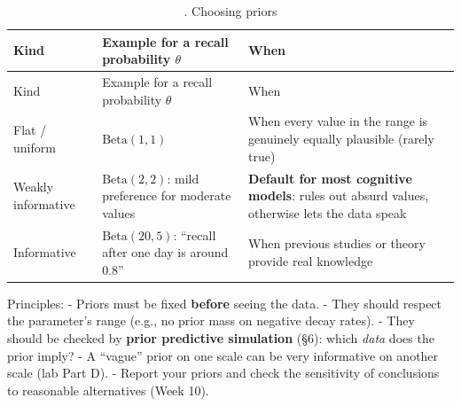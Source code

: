 \begin{longtable}[]{@{}
  >{\raggedright\arraybackslash}p{}
  >{\raggedright\arraybackslash}p{}
  >{\raggedright\arraybackslash}p{}@{}}
\caption{. Choosing priors}\tabularnewline
\toprule\noalign{}
\begin{minipage}[b]{\linewidth}\raggedright
Kind
\end{minipage} & \begin{minipage}[b]{\linewidth}\raggedright
Example for a recall probability \(\theta\)
\end{minipage} & \begin{minipage}[b]{\linewidth}\raggedright
When
\end{minipage} \\
\midrule\noalign{}
\endfirsthead
\toprule\noalign{}
\begin{minipage}[b]{\linewidth}\raggedright
Kind
\end{minipage} & \begin{minipage}[b]{\linewidth}\raggedright
Example for a recall probability \(\theta\)
\end{minipage} & \begin{minipage}[b]{\linewidth}\raggedright
When
\end{minipage} \\
\midrule\noalign{}
\endhead
\bottomrule\noalign{}
\endlastfoot
Flat / uniform & \(\mathrm{Beta}(1, 1)\) & When every value in the range
is genuinely equally plausible (rarely true) \\
Weakly informative & \(\mathrm{Beta}(2, 2)\): mild preference for
moderate values & \textbf{Default for most cognitive models}: rules out
absurd values, otherwise lets the data speak \\
Informative & \(\mathrm{Beta}(20, 5)\): ``recall after one day is around
0.8'' & When previous studies or theory provide real knowledge \\
\end{longtable}

Principles: - Priors must be fixed \textbf{before} seeing the data. -
They should respect the parameter's range (e.g., no prior mass on
negative decay rates). - They should be checked by \textbf{prior
predictive simulation} (§6): which \emph{data} does the prior imply? - A
``vague'' prior on one scale can be very informative on another scale
(lab Part D). - Report your priors and check the sensitivity of
conclusions to reasonable alternatives (Week 10).

